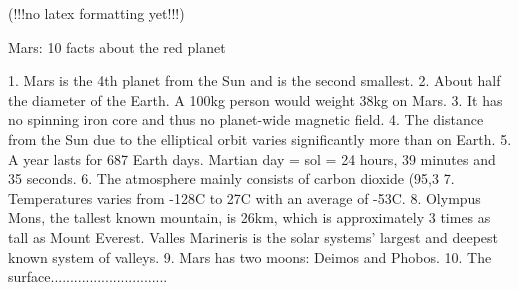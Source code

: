 (!!!no latex formatting yet!!!)

Mars: 10 facts about the red planet

1. Mars is the 4th planet from the Sun and is the second smallest.
2. About half the diameter of the Earth. A 100kg person would weight 38kg on Mars.
3. It has no spinning iron core and thus no planet-wide magnetic field.
4. The distance from the Sun due to the elliptical orbit varies significantly more than on Earth.
5. A year lasts for 687 Earth days. Martian day = sol = 24 hours, 39 minutes and 35 seconds.
6. The atmosphere mainly consists of carbon dioxide (95,3%
7. Temperatures varies from -128C to 27C with an average of -53C.
8. Olympus Mons, the tallest known mountain, is 26km, which is approximately 3 times as tall as Mount Everest. Valles Marineris is the solar systems' largest and deepest known system of valleys.
9. Mars has two moons: Deimos and Phobos.
10. The surface..............................